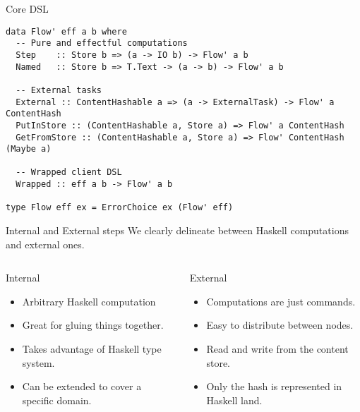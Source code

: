 \documentclass[11pt]{beamer}
\begin{document}
\begin{frame}[fragile]{Core DSL}
\begin{lstlisting}[basicstyle=\tiny]
data Flow' eff a b where
  -- Pure and effectful computations
  Step    :: Store b => (a -> IO b) -> Flow' a b
  Named   :: Store b => T.Text -> (a -> b) -> Flow' a b
  
  -- External tasks
  External :: ContentHashable a => (a -> ExternalTask) -> Flow' a ContentHash
  PutInStore :: (ContentHashable a, Store a) => Flow' a ContentHash
  GetFromStore :: (ContentHashable a, Store a) => Flow' ContentHash (Maybe a)
  
  -- Wrapped client DSL
  Wrapped :: eff a b -> Flow' a b

type Flow eff ex = ErrorChoice ex (Flow' eff)
\end{lstlisting}
\end{frame}

\begin{frame}{Internal and External steps}
We clearly delineate between Haskell computations and external ones.
\begin{columns}
\begin{column}{0.5\textwidth}
\begin{center}
Internal
\begin{itemize}
\item Arbitrary Haskell computation
\item Great for gluing things together.
\item Takes advantage of Haskell type system.
\item Can be extended to cover a specific domain.
\end{itemize}
\end{center}
\end{column}
\begin{column}{0.5\textwidth} 
\begin{center}
External
\begin{itemize}
\item Computations are just commands.
\item Easy to distribute between nodes.
\item Read and write from the content store.
\item Only the hash is represented in Haskell land.
\end{itemize}
\end{center}	
\end{column}
\end{columns}
\end{frame}
\end{document}
